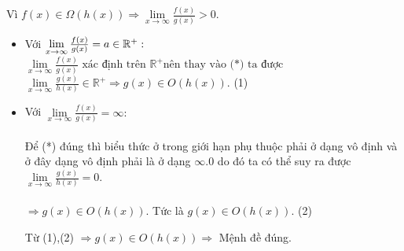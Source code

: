 \documentclass[12pt,a4paper]{article}
\begin{document}
\begin{enumerate}[label=\textbf{Câu 1.\arabic*} ]
        \hspace*{1cm} Vì $f(x)\in \Omega(h(x))\Rightarrow\lim\limits_{x\to\infty}\frac{f(x)}{g(x)}>0.$
        \begin{itemize}[label=$\bullet$]
            \item Với $\lim\limits_{x \to \infty}\frac{f(x)}{g(x)}=a\in\mathbb{R}^{+}:\\ \\$
                 $\lim\limits_{x \to \infty}\frac{f(x)}{g(x)}\text{ xác định trên }\mathbb{R}^{+}\text{nên thay vào (*) ta được} $
                 $\lim\limits_{x \to \infty}\frac{g(x)}{h(x)}\in \mathbb{R}^{+}\Rightarrow g(x)\in O(h(x)).$  (1)

            \item  Với $\lim\limits_{x \to \infty}\frac{f(x)}{g(x)}=\infty:$\\ \\
            Để (*) đúng thì biểu thức ở trong giới hạn phụ thuộc phải ở dạng vô định và ở đây dạng vô định phải là ở dạng $\infty.0$ do đó ta có thể suy ra được $\lim\limits_{x \to \infty}\frac{g(x)}{h(x)}=0.$\\ \\
            $\Rightarrow g(x)\in O(h(x)).$ Tức là $g(x)\in O(h(x)).$    (2)\\
            \begin{center}
                Từ (1),(2) $\Rightarrow g(x)\in O(h(x)) \Rightarrow $ Mệnh đề đúng.
            \end{center}

        \end{itemize}
    \end{enumerate}
\end{document}
